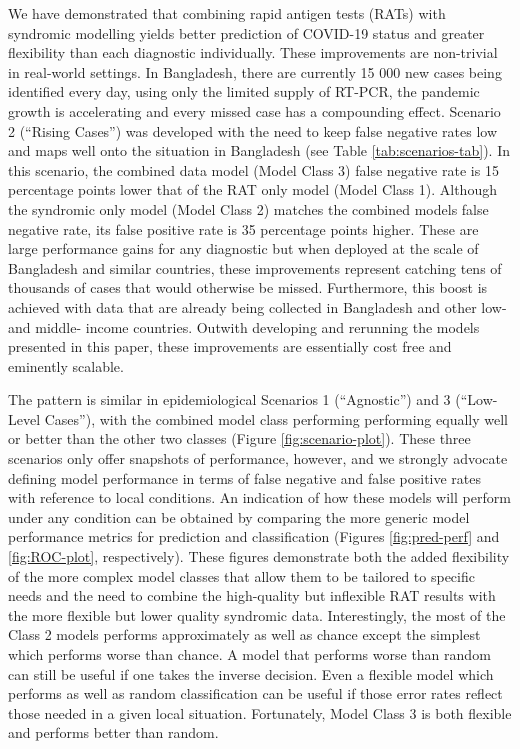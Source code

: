 \documentclass[]{elsarticle} %
\begin{document}
We have demonstrated that combining rapid antigen tests (RATs) with syndromic modelling yields better prediction of COVID-19 status and greater flexibility than each diagnostic individually.
These improvements are non-trivial in real-world settings.
In Bangladesh, there are currently 15 000 new cases being identified every day, using only the limited supply of RT-PCR, the pandemic growth is accelerating and every missed case has a compounding effect.
Scenario 2 (``Rising Cases'') was developed with the need to keep false negative rates low and maps well onto the situation in Bangladesh (see Table \ref{tab:scenarios-tab}).
In this scenario, the combined data model (Model Class 3) false negative rate is
15 percentage points lower that of the RAT only model (Model Class 1).
Although the syndromic only model (Model Class 2) matches the combined models false negative rate, its false positive rate is
35 percentage points higher.
These are large performance gains for any diagnostic but when deployed at the scale of Bangladesh and similar countries, these improvements represent catching tens of thousands of cases that would otherwise be missed.
Furthermore, this boost is achieved with data that are already being collected in Bangladesh and other low- and middle- income countries.
Outwith developing and rerunning the models presented in this paper, these improvements are essentially cost free and eminently scalable.

The pattern is similar in epidemiological Scenarios 1 (``Agnostic'') and 3 (``Low-Level Cases''), with the combined model class performing performing equally well or better than the other two classes (Figure \ref{fig:scenario-plot}).
These three scenarios only offer snapshots of performance, however, and we strongly advocate defining model performance in terms of false negative and false positive rates with reference to local conditions.
An indication of how these models will perform under any condition can be obtained by comparing the more generic model performance metrics for prediction and classification (Figures \ref{fig:pred-perf} and \ref{fig:ROC-plot}, respectively).
These figures demonstrate both the added flexibility of the more complex model classes that allow them to be tailored to specific needs and the need to combine the high-quality but inflexible RAT results with the more flexible but lower quality syndromic data.
Interestingly, the most of the Class 2 models performs approximately as well as chance except the simplest which performs worse than chance.
A model that performs worse than random can still be useful if one takes the inverse decision. 
Even a flexible model which performs as well as random classification can be useful if those error rates reflect those needed in a given local situation.
Fortunately, Model Class 3 is both flexible and performs better than random.
\end{document}
